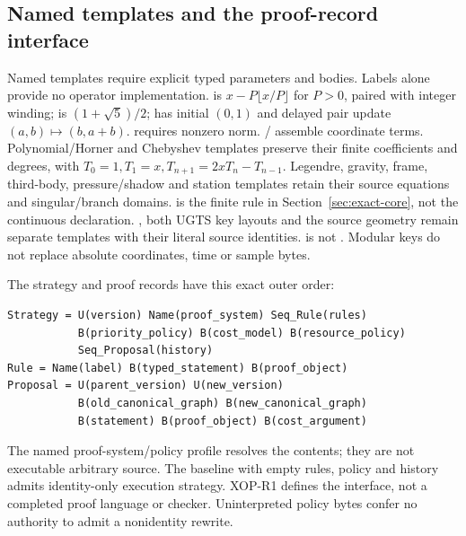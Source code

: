\subsection{Named templates and the proof-record interface}
Named templates require explicit typed parameters and bodies. Labels alone
provide no operator implementation.  is
$x-P\lfloor x/P\rfloor$ for $P>0$, paired with integer winding;
 is $(1+\sqrt5)/2$;  has initial $(0,1)$ and delayed
pair update $(a,b)\mapsto(b,a+b)$.  requires nonzero norm.
/ assemble coordinate  terms.
Polynomial/Horner and Chebyshev templates preserve their finite coefficients
and degrees, with $T_0=1,T_1=x,T_{n+1}=2xT_n-T_{n-1}$.
Legendre, gravity, frame, third-body, pressure/shadow and station templates retain
their source equations and singular/branch domains.  is the finite rule
in Section~\ref{sec:exact-core}, not the continuous  declaration.
, both UGTS key layouts and the source geometry remain separate
templates with their literal source identities.  is not .
Modular keys do not replace absolute coordinates, time or sample bytes.

The strategy and proof records have this exact outer order:
\begin{lstlisting}
Strategy = U(version) Name(proof_system) Seq_Rule(rules)
           B(priority_policy) B(cost_model) B(resource_policy)
           Seq_Proposal(history)
Rule = Name(label) B(typed_statement) B(proof_object)
Proposal = U(parent_version) U(new_version)
           B(old_canonical_graph) B(new_canonical_graph)
           B(statement) B(proof_object) B(cost_argument)
\end{lstlisting}
The named proof-system/policy profile resolves the  contents; they are
not executable arbitrary source. The baseline with empty rules, policy and
history admits identity-only execution strategy. XOP-R1 defines the interface,
not a completed proof language or checker. Uninterpreted policy bytes confer
no authority to admit a nonidentity rewrite.

